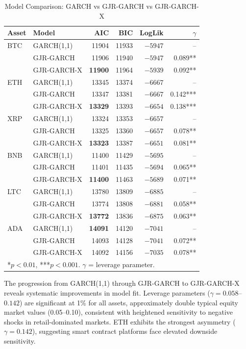 \documentclass[pdflatex,sn-mathphys-num]{sn-jnl}
\theoremstyle{thmstyleone}
\theoremstyle{thmstyletwo}
\theoremstyle{thmstylethree}
\begin{document}
\begin{table}[htbp]
\centering
\caption{Model Comparison: GARCH vs GJR-GARCH vs GJR-GARCH-X}\label{tab:model_comparison}
\small
\begin{tabular}{@{}llrrrr@{}}
\toprule
\textbf{Asset} & \textbf{Model} & \textbf{AIC} & \textbf{BIC} & \textbf{LogLik} & \textbf{$\gamma$} \\
\midrule
BTC & GARCH(1,1) & 11904 & 11933 & $-5947$ & -- \\
    & GJR-GARCH & 11906 & 11940 & $-5947$ & 0.089** \\
    & GJR-GARCH-X & \textbf{11900} & 11964 & $-5939$ & 0.092** \\
\midrule
ETH & GARCH(1,1) & 13345 & 13374 & $-6667$ & -- \\
    & GJR-GARCH & 13347 & 13381 & $-6667$ & 0.142*** \\
    & GJR-GARCH-X & \textbf{13329} & 13393 & $-6654$ & 0.138*** \\
\midrule
XRP & GARCH(1,1) & 13324 & 13353 & $-6657$ & -- \\
    & GJR-GARCH & 13325 & 13360 & $-6657$ & 0.078** \\
    & GJR-GARCH-X & \textbf{13323} & 13387 & $-6651$ & 0.081** \\
\midrule
BNB & GARCH(1,1) & 11400 & 11429 & $-5695$ & -- \\
    & GJR-GARCH & 11401 & 11435 & $-5694$ & 0.065** \\
    & GJR-GARCH-X & \textbf{11400} & 11463 & $-5689$ & 0.071** \\
\midrule
LTC & GARCH(1,1) & 13780 & 13809 & $-6885$ & -- \\
    & GJR-GARCH & 13774 & 13808 & $-6881$ & 0.058** \\
    & GJR-GARCH-X & \textbf{13772} & 13836 & $-6875$ & 0.063** \\
\midrule
ADA & GARCH(1,1) & \textbf{14091} & 14120 & $-7041$ & -- \\
    & GJR-GARCH & 14093 & 14128 & $-7041$ & 0.072** \\
    & GJR-GARCH-X & 14092 & 14156 & $-7035$ & 0.078** \\
\bottomrule
\multicolumn{6}{l}{\footnotesize **$p<0.01$, ***$p<0.001$. $\gamma$ = leverage parameter.}
\end{tabular}
\end{table}

The progression from GARCH(1,1) through GJR-GARCH to GJR-GARCH-X reveals systematic improvements in model fit. Leverage parameters ($\gamma = 0.058$--$0.142$) are significant at 1\% for all assets, approximately double typical equity market values (0.05--0.10), consistent with heightened sensitivity to negative shocks in retail-dominated markets. ETH exhibits the strongest asymmetry ($\gamma = 0.142$), suggesting smart contract platforms face elevated downside sensitivity.
\end{document}

